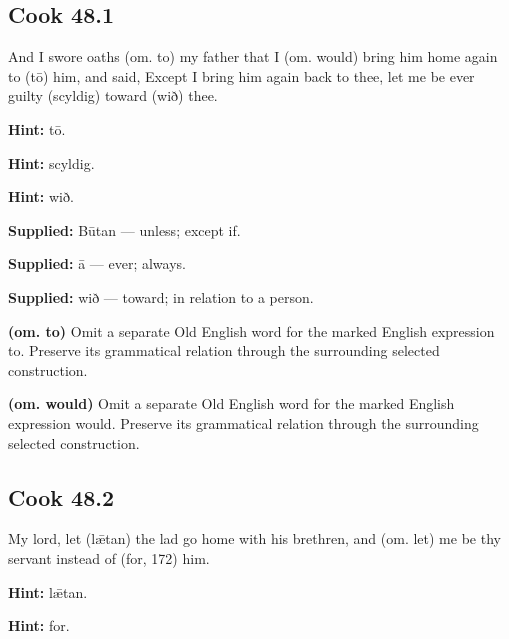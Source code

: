 \par\begin{minipage}{\linewidth}\raggedright
\subsection*{Cook 48.1}

And I swore oaths (om. to) my father that I (om. would) bring him home again to (tō) him, and said, Except I bring him again back to thee, let me be ever guilty (scyldig) toward (wið) thee.

\textbf{Hint:} tō.

\textbf{Hint:} scyldig.

\textbf{Hint:} wið.

\textbf{Supplied:} Būtan — unless; except if.

\textbf{Supplied:} ā — ever; always.

\textbf{Supplied:} wið — toward; in relation to a person.

\textbf{(om. to)} Omit a separate Old English word for the marked English expression to. Preserve its grammatical relation through the surrounding selected construction.

\textbf{(om. would)} Omit a separate Old English word for the marked English expression would. Preserve its grammatical relation through the surrounding selected construction.

\end{minipage}\par\addvspace{4pt}

\par\begin{minipage}{\linewidth}\raggedright
\subsection*{Cook 48.2}

My lord, let (lǣtan) the lad go home with his brethren, and (om. let) me be thy servant instead of (for, 172) him.

\textbf{Hint:} lǣtan.

\textbf{Hint:} for.

\end{minipage}\par\addvspace{4pt}


